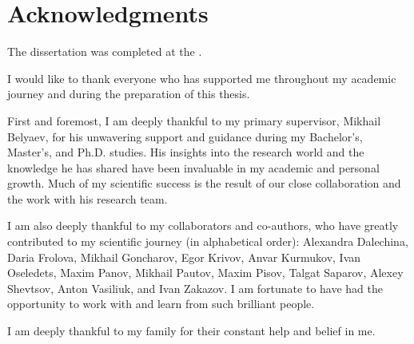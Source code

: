 


\section*{Acknowledgments} 
The dissertation was completed at the {\thesisOrganizationEnNonTitle}.

I would like to thank everyone who has supported me throughout my academic journey and during the preparation of this thesis.

First and foremost, I am deeply thankful to my primary supervisor, Mikhail Belyaev, for his unwavering support and guidance during my Bachelor's, Master's, and Ph.D. studies. His insights into the research world and the knowledge he has shared have been invaluable in my academic and personal growth. Much of my scientific success is the result of our close collaboration and the work with his research team.

I am also deeply thankful to my collaborators and co-authors, who have greatly contributed to my scientific journey (in alphabetical order): Alexandra Dalechina, Daria Frolova, Mikhail Goncharov, Egor Krivov, Anvar Kurmukov, Ivan Oseledets, Maxim Panov, Mikhail Pautov, Maxim Pisov, Talgat Saparov, Alexey Shevtsov, Anton Vasiliuk, and Ivan Zakazov. I am fortunate to have had the opportunity to work with and learn from such brilliant people.

I am deeply thankful to my family for their constant help and belief in me.


